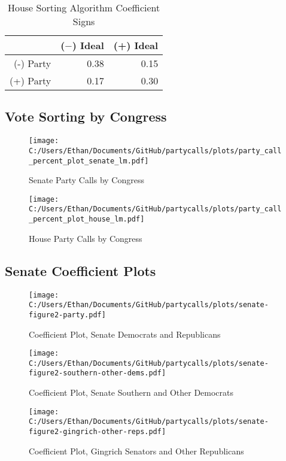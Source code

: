 \documentclass[12pt]{article}
\begin{document}
\begin{table}[ht]
	\centering
	\caption{House Sorting Algorithm Coefficient Signs}
	\begin{tabular}{rrr}
		\hline
		& ($-$) Ideal & (+) Ideal \\ 
		\hline
		(-) Party & 0.38 & 0.15 \\ 
		(+) Party & 0.17 & 0.30 \\ 
		\hline
	\end{tabular}
\end{table}

\clearpage

\subsection{Vote Sorting by Congress}

\begin{figure}[h]
	\centering
	\caption{Senate Party Calls by Congress}
	\texttt{[image: C:/Users/Ethan/Documents/GitHub/partycalls/plots/party\_call\_percent\_plot\_senate\_lm.pdf]}
\end{figure}


\begin{figure}[h]
	\centering
	\caption{House Party Calls by Congress}
	\texttt{[image: C:/Users/Ethan/Documents/GitHub/partycalls/plots/party\_call\_percent\_plot\_house\_lm.pdf]}
\end{figure}


\clearpage

\subsection{Senate Coefficient Plots}

\begin{figure}[ht]
	\centering
	\caption{Coefficient Plot, Senate Democrats and Republicans}
	\texttt{[image: C:/Users/Ethan/Documents/GitHub/partycalls/plots/senate-figure2-party.pdf]}
\end{figure}

\begin{figure}[ht]
	\centering
	\caption{Coefficient Plot, Senate Southern and Other Democrats}
	\texttt{[image: C:/Users/Ethan/Documents/GitHub/partycalls/plots/senate-figure2-southern-other-dems.pdf]}
\end{figure}

\begin{figure}[ht]
	\centering
	\caption{Coefficient Plot, Gingrich Senators and Other Republicans}
	\texttt{[image: C:/Users/Ethan/Documents/GitHub/partycalls/plots/senate-figure2-gingrich-other-reps.pdf]}
\end{figure}
\end{document}
